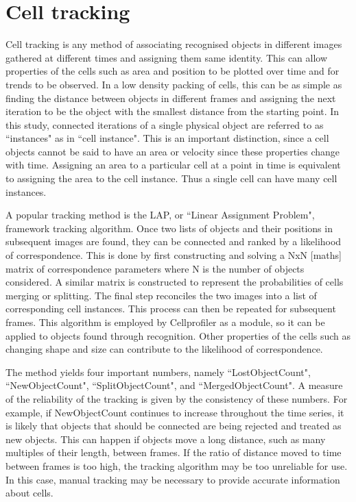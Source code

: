 \section{Cell tracking}

Cell tracking is any method of associating recognised objects in different images gathered at different times and assigning them same identity. This can allow properties of the cells such as area and position to be plotted over time and for trends to be observed. In a low density packing of cells, this can be as simple as finding the distance between objects in different frames and assigning the next iteration to be the object with the smallest distance from the starting point. In this study, connected iterations of a single physical object are referred to as ``instances" as in ``cell instance". This is an important distinction, since a cell objects cannot be said to have an area or velocity since these properties change with time. Assigning an area to a particular cell at a point in time is equivalent to assigning the area to the cell instance. Thus a single cell can have many cell instances.

A popular tracking method is the LAP, or ``Linear Assignment Problem", framework tracking algorithm. Once two lists of objects and their positions in subsequent images are found, they can be connected and ranked by a likelihood of correspondence. This is done by first constructing and solving a NxN [maths] matrix of correspondence parameters where N is the number of objects considered. A similar matrix is constructed to represent the probabilities of cells merging or splitting. The final step reconciles the two images into a list of corresponding cell instances. This process can then be repeated for subsequent frames. This algorithm is employed by Cellprofiler as a module, so it can be applied to objects found through recognition. Other properties of the cells such as changing shape and size can contribute to the likelihood of correspondence.

The method yields four important numbers, namely ``LostObjectCount", ``NewObjectCount", ``SplitObjectCount", and ``MergedObjectCount". A measure of the reliability of the tracking is given by the consistency of these numbers. For example, if NewObjectCount continues to increase throughout the time series, it is likely that objects that should be connected are being rejected and treated as new objects. This can happen if objects move a long distance, such as many multiples of their length, between frames. If the ratio of distance moved to time between frames is too high, the tracking algorithm may be too unreliable for use. In this case, manual tracking may be necessary to provide accurate information about cells.

